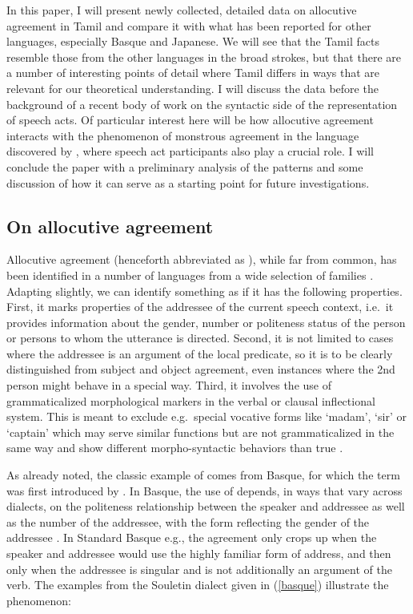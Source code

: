 \documentclass[output=paper, modfonts, nonflat]{langsci/langscibook}
\begin{document}
In this paper, I will present newly collected, detailed data on
allocutive agreement in Tamil and compare it with what has been
reported for other languages, especially Basque and Japanese. We will
see that the Tamil facts resemble those from the other languages in
the broad strokes, but that there are a number of interesting points
of detail where Tamil differs in ways that are relevant for our
theoretical understanding. I will discuss the data before the
background of a recent body of work on the syntactic side of the
representation of speech acts. Of particular interest here will be how
allocutive agreement interacts with the phenomenon of monstrous
agreement in the language discovered by \citet{sundaresan:diss}, where
speech act participants also play a crucial role. I will conclude the
paper with a preliminary analysis of the patterns and some discussion
of how it can serve as a starting point for future investigations.


\subsection{On allocutive agreement}
\label{sec:backallagr}

Allocutive agreement (henceforth abbreviated as \allagr), while far
from common, has been identified in a number of languages from a wide
selection of families \citep[see][for an initial typological
overview]{antonov:2015}. Adapting \citet{antonov:2015} slightly, we
can identify something as \allagr{} if it has the following
properties. First, it marks properties of the addressee of the current
speech context, i.e.\ it provides information about the gender, number
or politeness status of the person or persons to whom the utterance is
directed. Second, it is not limited to cases where the addressee is an
argument of the local predicate, so it is to be clearly distinguished
from subject and object agreement, even instances where the 2nd person
might behave in a special way. Third, it involves the use of
grammaticalized morphological markers in the verbal or clausal
inflectional system. This is meant to exclude e.g.\ special vocative
forms like `madam', `sir' or `captain' which may serve similar
functions but are not grammaticalized in the same way and show
different morpho-syntactic behaviors than true \allagr.

As already noted, the classic example of \allagr{} comes from Basque,
for which the term was first introduced by \citet{bonaparte:1862}. In
Basque, the use of \allagr{} depends, in ways that vary across
dialects, on the politeness relationship between the speaker and
addressee as well as the number of the addressee, with the form
reflecting the gender of the addressee \citep[see also][ch.\
5]{oyharcabal:1993, alcazarsaltarelli:2014}. In Standard Basque e.g.,
the agreement only crops up when the speaker and addressee would use
the highly familiar form of address, and then only when the addressee
is singular and is not additionally an argument of the verb. The
examples from the Souletin dialect given in (\ref{basque})
\citep[reported by][]{antonov:2015} illustrate the phenomenon:
\end{document}
